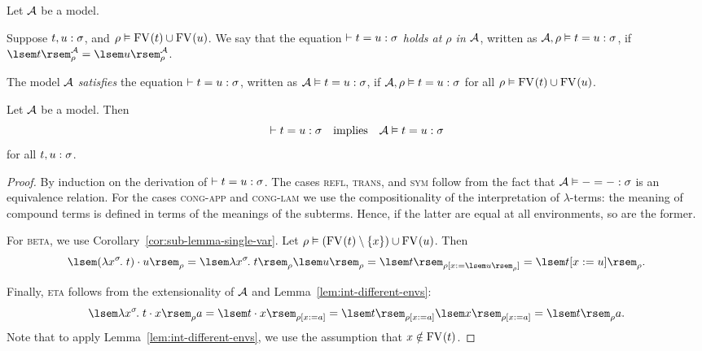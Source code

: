 \begin{defn}[Satisfaction] \label{def:satisfaction}
Let $\struct{A}$ be a model.
\begin{enum}
\item Suppose $\typedtm{t, u}{\sigma}$, and $\typedenv{\rho}{\FV{t} \cup \FV{u}}$. We say that the equation $\conv{t}{u}{\sigma}$ \emph{holds at $\rho$ in $\struct{A}$}, written as $\modsat{\struct{A}, \rho}{t}{u}{\sigma}$, if $\sint[\struct{A}]{t}{\rho} = \sint[\struct{A}]{u}{\rho}$.

\item The model $\struct{A}$ \emph{satisfies} the equation $\conv{t}{u}{\sigma}$, written as $\modsat{\struct{A}}{t}{u}{\sigma}$, if $\modsat{\struct{A}, \rho}{t}{u}{\sigma}$ for all $\typedenv{\rho}{\FV{t} \cup \FV{u}}$.
\end{enum}
\end{defn}

\begin{thm}[Soundness] \label{thm:soundness}
Let $\struct{A}$ be a model. Then
\[ \conv{t}{u}{\sigma} \quad\text{implies}\quad \modsat{\struct{A}}{t}{u}{\sigma} \]
for all $\typedtm{t, u}{\sigma}$.
\begin{proof}
By induction on the derivation of $\conv{t}{u}{\sigma}$. The cases \textsc{refl}, \textsc{trans}, and \textsc{sym} follow from the fact that $\modsat{\struct{A}}{-}{-}{\sigma}$ is an equivalence relation. For the cases \textsc{cong-app} and \textsc{cong-lam} we use the compositionality of the interpretation of $\lambda$-terms: the meaning of compound terms is defined in terms of the meanings of the subterms. Hence, if the latter are equal at all environments, so are the former.

For \textsc{beta}, we use Corollary~\ref{cor:sub-lemma-single-var}. Let $\typedenv{\rho}{(\FV{t} \setminus \singset[x]) \cup \FV{u}}$. Then
\[ \sint{\app{(\lamv{x}{\sigma}{t})}{u}}{\rho} = \sint{\lamv{x}{\sigma}{t}}{\rho} \sint{u}{\rho} = \sint{t}{\updenv{\rho}{x}{\sint{u}{\rho}}} = \sint{\subst{t}{\singsubv{x}{u}}}{\rho}. \]

Finally, \textsc{eta} follows from the extensionality of $\struct{A}$ and Lemma~\ref{lem:int-different-envs}:
\[ \sint{\lamv{x}{\sigma}{\app{t}{x}}}{\rho} a = \sint{\app{t}{x}}{\updenv{\rho}{x}{a}} = \sint{t}{\updenv{\rho}{x}{a}} \sint{x}{\updenv{\rho}{x}{a}} = \sint{t}{\rho} a. \]
Note that to apply Lemma~\ref{lem:int-different-envs}, we use the assumption that $x \notin \FV{t}$.
\end{proof}
\end{thm}

